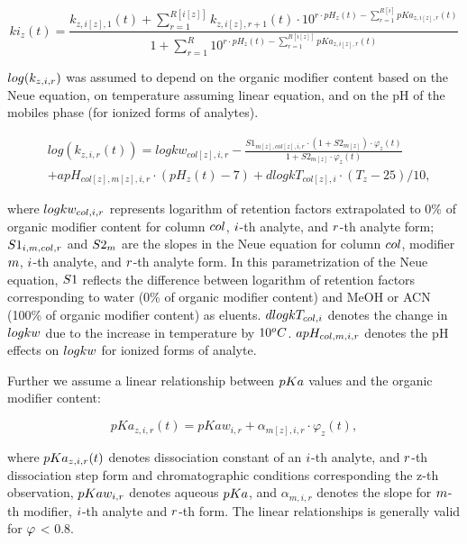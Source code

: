 \documentclass[
]{article}
\begin{document}
\[
ki_z(t)=\frac{k_{z,i[z],1}(t)+\sum_{r=1}^{R[i[z]]} k_{z,i[z],r+1}(t) \cdot 10^{r\cdot pH_z(t)-\sum_{r=1}^{R[i]} pKa_{z,i[z],r}(t)} }{1+\sum_{r=1}^R 10^{r\cdot pH_z(t)-\sum_{r=1}^{R[i[z]]} pKa_{z,i[z],r}(t) } }
\]

\(\small log(k_{z,i,r})\) was assumed to depend on the organic modifier
content based on the Neue equation, on temperature assuming linear
equation, and on the pH of the mobiles phase (for ionized forms of
analytes).

\[
\begin{aligned}
& log(k_{z,i,r}(t)) = logkw_{col[z],i,r} - \frac{S1_{m[z],col[z],i,r} \cdot (1+S2_{m[z]}) \cdot \varphi_z(t)}{1+S2_{m[z]} \cdot \varphi_z(t)}  \\ 
& + apH_{col[z],m[z],i,r} \cdot (pH_z(t)-7) + dlogkT_{col[z],i} \cdot (T_z-25)/10,
\end{aligned}
\]

where \(\small logkw_{col,i,r}\) represents logarithm of retention
factors extrapolated to 0\% of organic modifier content for column
\(\small col\), \(\small i\)-th analyte, and \(\small r\)-th analyte
form; \(\small S1_{i,m,col,r}\) and \(\small S2_m\) are the slopes in
the Neue equation for column \(\small col\), modifier \(\small m\),
\(\small i\)-th analyte, and \(\small r\)-th analyte form. In this
parametrization of the Neue equation, \(\small S1\) reflects the
difference between logarithm of retention factors corresponding to water
(0\% of organic modifier content) and MeOH or ACN (100\% of organic
modifier content) as eluents. \(\small dlogkT_{col,i}\) denotes the
change in \(\small logkw\) due to the increase in temperature by
\(\small 10^oC\). \(\small apH_{col,m,i,r}\) denotes the pH effects on
\(\small logkw\) for ionized forms of analyte.

Further we assume a linear relationship between \(\small pKa\) values
and the organic modifier content:

\[
pKa_{z,i,r}(t)=pKaw_{i,r}+\alpha_{m[z],i,r}\cdot\varphi_z(t),
\]

where \(\small pKa_{z,i,r}(t)\) denotes dissociation constant of an
\(\small i\)-th analyte, and \(\small r\)-th dissociation step form and
chromatographic conditions corresponding the z-th observation,
\(\small pKaw_{i,r}\) denotes aqueous \(\small pKa\), and
\(\alpha_{m,i,r}\) denotes the slope for \(\small m\)-th modifier,
\(\small i\)-th analyte and \(\small r\)-th form. The linear
relationships is generally valid for \(\small \varphi\) \textless{} 0.8.
\end{document}
